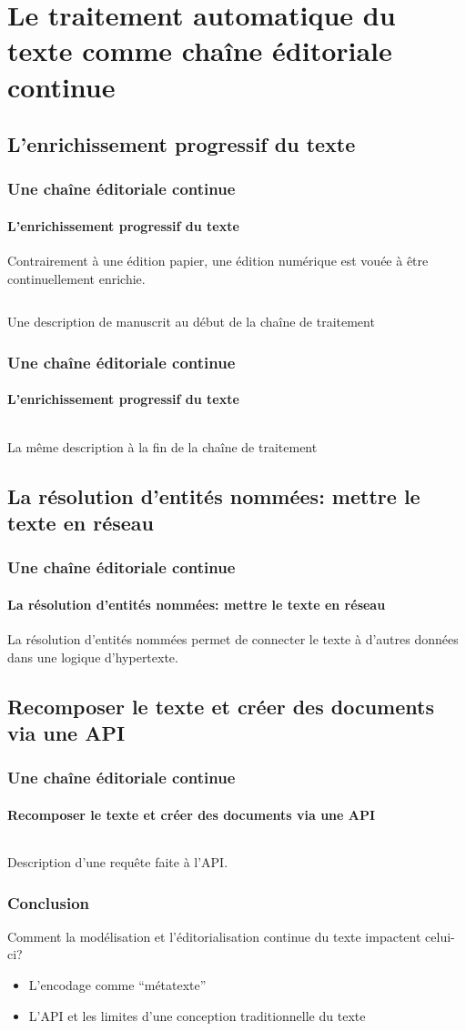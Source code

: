 \documentclass{beamer}
\begin{document}
\section{Le traitement automatique du texte comme chaîne éditoriale continue}
\subsection{L'enrichissement progressif du texte}
\begin{frame}
	\frametitle{Une chaîne éditoriale continue}
	\framesubtitle{L'enrichissement progressif du texte}
	
	Contrairement à une édition papier, une édition numérique est vouée à être continuellement enrichie.
	\begin{listing}[h]
		\centering
		\inputminted{xml}{includes/tei_item_simple.xml}
		\caption{Une description de manuscrit au début de la chaîne de traitement}
	\end{listing}
\end{frame}

\begin{frame}
	\frametitle{Une chaîne éditoriale continue}
	\framesubtitle{L'enrichissement progressif du texte}
	
	\begin{listing}[h]
		\centering
		\inputminted{xml}{includes/tei_item.xml}
		\caption{La même description à la fin de la chaîne de traitement}
	\end{listing}
\end{frame}

\subsection{La résolution d'entités nommées: mettre le texte en réseau}
\begin{frame}
	\frametitle{Une chaîne éditoriale continue}
	\framesubtitle{La résolution d'entités nommées: mettre le texte en réseau}
	
	La résolution d'entités nommées permet de connecter le texte à d'autres données dans une logique d'hypertexte.
\end{frame}

\subsection{Recomposer le texte et créer des documents via une API}
\begin{frame}
	\frametitle{Une chaîne éditoriale continue}
	\framesubtitle{Recomposer le texte et créer des documents via une API}
	
	\begin{listing}[h]
		\centering
		\inputminted{xml}{includes/api.xml}
		\caption{Description d'une requête faite à l'API.}
	\end{listing}
\end{frame}

\begin{frame}
	\frametitle{Conclusion}
	
	Comment la modélisation et l'éditorialisation continue du texte impactent celui-ci?
	\begin{itemize}
		\item L'encodage comme \enquote{métatexte}
		\item L'API et les limites d'une conception traditionnelle du texte
	\end{itemize}
\end{frame}
\end{document}
